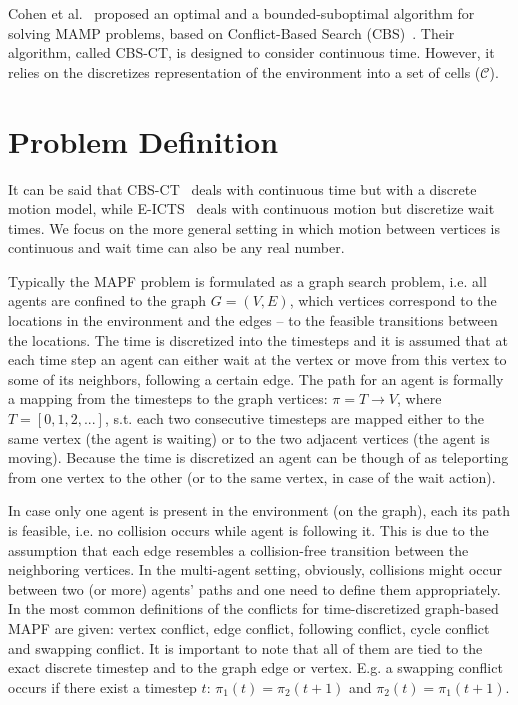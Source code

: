 Cohen et al.~\cite{cohen2019optimal} proposed an optimal and a bounded-suboptimal algorithm for solving MAMP problems, based on Conflict-Based Search (CBS)~\cite{sharon2015conflict}. Their algorithm, called CBS-CT, is designed to consider continuous time. However, it relies on the discretizes representation of the environment into a set of cells ($\mathcal{C}$). 




\section{Problem Definition}

It can be said that CBS-CT~\cite{cohen2019optimal} deals with continuous time but with a discrete motion model, 
while E-ICTS~\cite{walker2018extended} deals with continuous motion but discretize wait times. We focus on the more general setting in which motion between vertices is continuous and wait time can also be any real number. 



Typically the \ac{MAPF} problem is formulated as a graph search problem, i.e. all agents are confined to the graph $G=(V, E)$, which vertices correspond to the locations in the environment and the edges -- to the feasible transitions between the locations. The time is discretized into the timesteps and it is assumed that at each time step an agent can either wait at the vertex or move from this vertex to some of its neighbors, following a certain edge. The path for an agent is formally a mapping from the timesteps to the graph vertices: $\pi = T \rightarrow V$, where $T=[0, 1, 2, ...]$, s.t. each two consecutive timesteps are mapped either to the same vertex (the agent is waiting) or to the two adjacent vertices (the agent is moving). Because the time is discretized an agent can be though of as teleporting from one vertex to the other (or to the same vertex, in case of the wait action).

In case only one agent is present in the environment (on the graph), each its path is feasible, i.e. no collision occurs while agent is following it. This is due to the assumption that each edge resembles a collision-free transition between the neighboring vertices. In the multi-agent setting, obviously, collisions might occur between two (or more) agents' paths and one need to define them appropriately. In \cite{} the most common definitions of the conflicts for time-discretized graph-based MAPF are given: vertex conflict, edge conflict, following conflict, cycle conflict and swapping conflict. It is important to note that all of them are tied to the exact discrete timestep and to the graph edge or vertex. E.g. a swapping conflict occurs if there exist a timestep $t$: $\pi_1(t)=\pi_2(t+1)$ and $\pi_2(t)=\pi_1(t+1)$.

